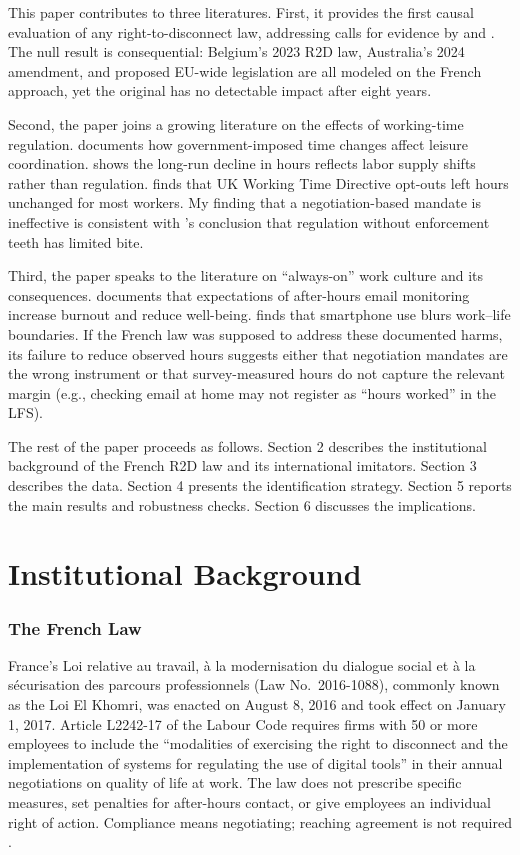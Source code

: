 \documentclass[12pt]{article}
\begin{document}
This paper contributes to three literatures. First, it provides the first causal evaluation of any right-to-disconnect law, addressing calls for evidence by \citet{eurofound2020right} and \citet{ilo2023disconnect}. The null result is consequential: Belgium's 2023 R2D law, Australia's 2024 amendment, and proposed EU-wide legislation are all modeled on the French approach, yet the original has no detectable impact after eight years.

Second, the paper joins a growing literature on the effects of working-time regulation. \citet{hamermesh2014cues} documents how government-imposed time changes affect leisure coordination. \citet{costa2000hours} shows the long-run decline in hours reflects labor supply shifts rather than regulation. \citet{bell2003consequences} finds that UK Working Time Directive opt-outs left hours unchanged for most workers. My finding that a negotiation-based mandate is ineffective is consistent with \citeauthor{bell2003consequences}'s conclusion that regulation without enforcement teeth has limited bite.

Third, the paper speaks to the literature on ``always-on'' work culture and its consequences. \citet{barber2015sleeping} documents that expectations of after-hours email monitoring increase burnout and reduce well-being. \citet{derks2014smartphone} finds that smartphone use blurs work--life boundaries. If the French law was supposed to address these documented harms, its failure to reduce observed hours suggests either that negotiation mandates are the wrong instrument or that survey-measured hours do not capture the relevant margin (e.g., checking email at home may not register as ``hours worked'' in the LFS).

The rest of the paper proceeds as follows. Section 2 describes the institutional background of the French R2D law and its international imitators. Section 3 describes the data. Section 4 presents the identification strategy. Section 5 reports the main results and robustness checks. Section 6 discusses the implications.


\section{Institutional Background}

\subsubsection*{The French Law} France's Loi relative au travail, \`a la modernisation du dialogue social et \`a la s\'ecurisation des parcours professionnels (Law No.\ 2016-1088), commonly known as the Loi El Khomri, was enacted on August 8, 2016 and took effect on January 1, 2017. Article L2242-17 of the Labour Code requires firms with 50 or more employees to include the ``modalities of exercising the right to disconnect and the implementation of systems for regulating the use of digital tools'' in their annual negotiations on quality of life at work. The law does not prescribe specific measures, set penalties for after-hours contact, or give employees an individual right of action. Compliance means negotiating; reaching agreement is not required \citep{ray2018droit, eurofound2020right}.
\end{document}
